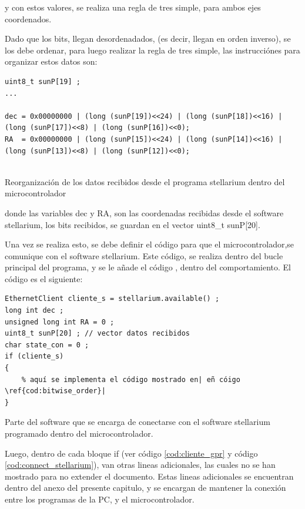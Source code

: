 y con estos valores, se realiza una regla de tres simple, para ambos ejes coordenados. 

Dado que los bits, llegan desordenadados, (es decir, llegan en orden inverso), se los debe ordenar, para luego realizar la regla de tres simple, las instrucciónes para organizar estos datos son: 

\begin{listing}
\begin{verbatim}
uint8_t sunP[19] ; 
... 

dec = 0x00000000 | (long (sunP[19])<<24) | (long (sunP[18])<<16) | (long (sunP[17])<<8) | (long (sunP[16])<<0);
RA  = 0x00000000 | (long (sunP[15])<<24) | (long (sunP[14])<<16) | (long (sunP[13])<<8) | (long (sunP[12])<<0);
 	
\end{verbatim}
\caption{Reorganización de los datos recibidos desde el programa stellarium dentro del microcontrolador}
\label{cod:bitwise_order}
\end{listing}

donde las variables dec y RA, son las coordenadas recibidas desde el software stellarium, los bits recibidos, se guardan en el vector uint8\_t sunP[20].

Una vez se realiza esto, se debe definir el código para que el microcontrolador,se comunique con el software stellarium. Este código, se realiza dentro del bucle principal del programa, y se le añade el código \label{cod:bitwise_order}, dentro del comportamiento. El código es el siguiente: 

\begin{listing}
	\begin{verbatim}
EthernetClient cliente_s = stellarium.available() ; 
long int dec ; 
unsigned long int RA = 0 ; 
uint8_t sunP[20] ; // vector datos recibidos 
char state_con = 0 ; 
if (cliente_s)
{
	% aquí se implementa el código mostrado en| eñ cóigo \ref{cod:bitwise_order}|   
}
	\end{verbatim}
\caption{Parte del software que se encarga de conectarse con el software stellarium programado dentro del microcontrolador.}
\label{cod:connect_stellarium}
\end{listing} 

Luego, dentro de cada bloque if (ver código \ref{cod:cliente_gpr} y código \ref{cod:connect_stellarium}), van otras lineas adicionales, las cuales no se han mostrado para no extender el documento. Estas lineas adicionales se encuentran dentro del anexo del presente capitulo, y se encargan de mantener la conexión entre los programas de la PC, y el microcontrolador. 
   
